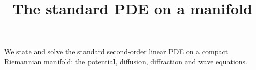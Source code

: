\title{The standard PDE on a manifold}

We state and solve the standard second-order linear PDE on a compact
Riemannian manifold: the potential, diffusion, diffraction and wave
equations.

\newcommand{\R}{\mathbf{R}}
\newcommand{\Z}{\mathbf{Z}}

%
%
%
%
%
%
%
%
%
%
%
%
%


